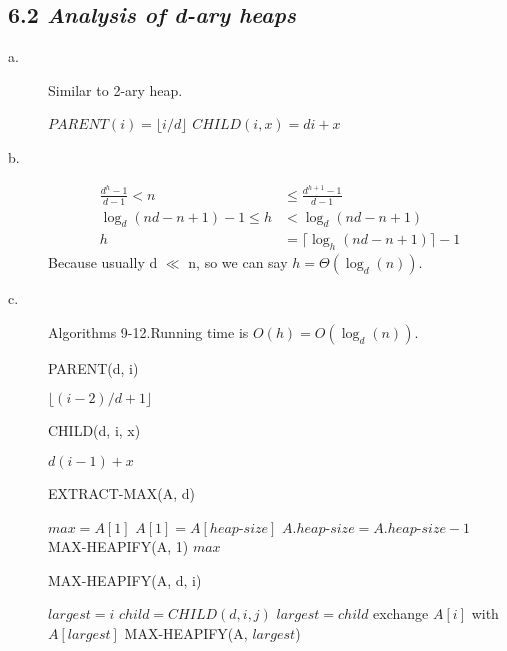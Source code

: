 \documentclass{article}
\begin{document}
\subsection*{6.2 \textit{\textbf{Analysis of d-ary heaps}}}
\begin{description}
\item[a. ] Similar to 2-ary heap.
  \begin{algorithmic}
    \STATE $PARENT(i) = \lfloor {i/d} \rfloor$
    \STATE $CHILD(i, x) = di+x$ 
  \end{algorithmic}

\item[b. ]
  \begin{align*}
    \frac{d^h-1}{d-1} < n &\le \frac{d^{h+1}-1}{d-1}\\
    \log_d(nd-n+1)-1 \le h &< \log_d(nd-n+1)\\
    h &= \lceil {\log_h(nd-n+1)} \rceil - 1
  \end{align*}
  Because usually d $\ll$ n, so we can say $h = \Theta(\log_d(n))$.



\item[c. ] Algorithms 9-12.Running time is $O(h) = O(\log_d(n))$.

  \begin{algorithm}
    \caption{PARENT(d, i)}
    \begin{algorithmic}[1]
      \RETURN $\lfloor {(i-2)/d+1} \rfloor$
    \end{algorithmic}
  \end{algorithm}

  \begin{algorithm}
    \caption{CHILD(d, i, x)}
    \begin{algorithmic}
      \RETURN $d(i-1)+x$
    \end{algorithmic}
  \end{algorithm}

  \begin{algorithm}
    \caption{EXTRACT-MAX(A, d)}
    \begin{algorithmic}[1]
      \STATE $max = A[1]$
      \STATE $A[1] = A[heap\textrm{-}size]$
      \STATE $A.heap\textrm{-}size = A.heap\textrm{-}size - 1$
      \STATE MAX-HEAPIFY(A, 1)
      \RETURN $max$
    \end{algorithmic}
  \end{algorithm}

  \begin{algorithm}
    \caption{MAX-HEAPIFY(A, d, i)}
    \begin{algorithmic}[1]
      \STATE $largest = i$
      \STATE $child = CHILD(d, i, j)$
      \STATE $largest = child$
      \ENDIF
      \ENDFOR
      \STATE exchange $A[i]$ with $A[largest]$
      \STATE MAX-HEAPIFY(A, $largest$)
      \ENDIF
    \end{algorithmic}
  \end{algorithm}



\end{description}
\end{document}
